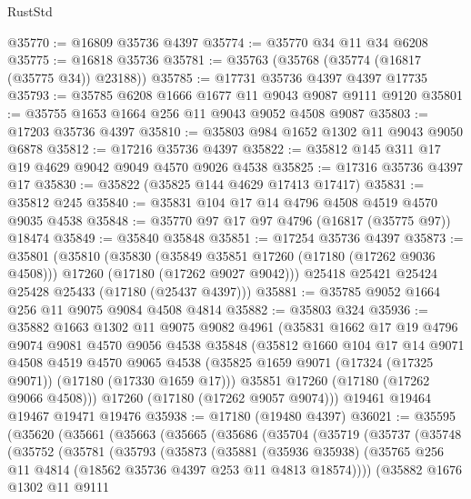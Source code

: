 \begin{lexlean}{RustStd}
\begin{coremodule}
{\begin{coremodule}
{{{{{{{{{{{{{{{{{{{{{{{{{{{{{{{{{{{{{{{{{{{{{{{{{{{{{{{@35770 := @16809 @35736 @4397
@35774 := @35770 @34 @11 @34 @6208
@35775 := @16818 @35736
@35781 := @35763 (@35768 (@35774 (@16817 (@35775 @34)) @23188))
@35785 := @17731 @35736 @4397 @4397 @17735
@35793 := @35785 @6208 @1666 @1677 @11 @9043 @9087 @9111 @9120
@35801 := @35755 @1653 @1664 @256 @11 @9043 @9052 @4508 @9087
@35803 := @17203 @35736 @4397
@35810 := @35803 @984 @1652 @1302 @11 @9043 @9050 @6878
@35812 := @17216 @35736 @4397
@35822 := @35812 @145 @311 @17 @19 @4629 @9042 @9049 @4570 @9026 @4538
@35825 := @17316 @35736 @4397 @17
@35830 := @35822 (@35825 @144 @4629 @17413 @17417)
@35831 := @35812 @245
@35840 := @35831 @104 @17 @14 @4796 @4508 @4519 @4570 @9035 @4538
@35848 := @35770 @97 @17 @97 @4796 (@16817 (@35775 @97)) @18474
@35849 := @35840 @35848
@35851 := @17254 @35736 @4397
@35873 := @35801
    (@35810
      (@35830
        (@35849 @35851 @17260 (@17180 (@17262 @9036 @4508)))
        @17260
        (@17180 (@17262 @9027 @9042)))
      @25418
      @25421
      @25424
      @25428
      @25433
      (@17180 (@25437 @4397)))
@35881 := @35785 @9052 @1664 @256 @11 @9075 @9084 @4508 @4814
@35882 := @35803 @324
@35936 := @35882
    @1663
    @1302
    @11
    @9075
    @9082
    @4961
    (@35831
      @1662
      @17
      @19
      @4796
      @9074
      @9081
      @4570
      @9056
      @4538
      @35848
      (@35812
        @1660
        @104
        @17
        @14
        @9071
        @4508
        @4519
        @4570
        @9065
        @4538
        (@35825 @1659 @9071 (@17324 (@17325 @9071)) (@17180 (@17330 @1659 @17)))
        @35851
        @17260
        (@17180 (@17262 @9066 @4508)))
      @17260
      (@17180 (@17262 @9057 @9074)))
    @19461
    @19464
    @19467
    @19471
    @19476
@35938 := @17180 (@19480 @4397)
@36021 := @35595
    (@35620
      (@35661
        (@35663
          (@35665
            (@35686
              (@35704
                (@35719
                  (@35737
                    (@35748
                      (@35752
                        (@35781
                          (@35793
                            (@35873
                              (@35881
                                (@35936 @35938)
                                (@35765
                                  @256
                                  @11
                                  @4814
                                  (@18562 @35736 @4397 @253 @11 @4813 @18574))))
                            (@35882
                              @1676
                              @1302
                              @11
                              @9111
}}}}}}}}}}}}}}}}}}}}}}}}}}}}}}}}}}}}}}}}}}}}}}}}}}}}}}}
\end{coremodule}}
\end{coremodule}
\end{lexlean}

